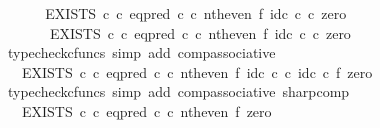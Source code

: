 \begin{isabellebody}
%
\isadelimproof
%
\endisadelimproof
%
\isatagproof
{}\isamarkupfalse%
\ {\isacharminus}{\kern0pt}\isanewline
\ \ \isamarkupfalse%
\ \ {\isachardoublequoteopen}{\isacharparenleft}{\kern0pt}EXISTS\ {\isasymnat}\isactrlsub c\ {\isasymcirc}\isactrlsub c\ {\isacharparenleft}{\kern0pt}eq{\isacharunderscore}{\kern0pt}pred\ {\isasymnat}\isactrlsub c\ {\isasymcirc}\isactrlsub c\ nth{\isacharunderscore}{\kern0pt}even\ {\isasymtimes}\isactrlsub f\ id\isactrlsub c\ {\isasymnat}\isactrlsub c{\isacharparenright}{\kern0pt}\isactrlsup {\isasymsharp}{\isacharparenright}{\kern0pt}\ {\isasymcirc}\isactrlsub c\ zero\isanewline
\ \ \ \ \ \ {\isacharequal}{\kern0pt}\ EXISTS\ {\isasymnat}\isactrlsub c\ {\isasymcirc}\isactrlsub c\ {\isacharparenleft}{\kern0pt}eq{\isacharunderscore}{\kern0pt}pred\ {\isasymnat}\isactrlsub c\ {\isasymcirc}\isactrlsub c\ nth{\isacharunderscore}{\kern0pt}even\ {\isasymtimes}\isactrlsub f\ id\isactrlsub c\ {\isasymnat}\isactrlsub c{\isacharparenright}{\kern0pt}\isactrlsup {\isasymsharp}\ {\isasymcirc}\isactrlsub c\ zero{\isachardoublequoteclose}\isanewline
\ \ \ \ \isamarkupfalse%
\ {\isacharparenleft}{\kern0pt}typecheck{\isacharunderscore}{\kern0pt}cfuncs{\isacharcomma}{\kern0pt}\ simp\ add{\isacharcolon}{\kern0pt}\ comp{\isacharunderscore}{\kern0pt}associative{}{\isacharparenright}{\kern0pt}\isanewline
\ \ \isamarkupfalse%
\ \isamarkupfalse%
\ {\isachardoublequoteopen}{\isachardot}{\kern0pt}{\isachardot}{\kern0pt}{\isachardot}{\kern0pt}\ {\isacharequal}{\kern0pt}\ EXISTS\ {\isasymnat}\isactrlsub c\ {\isasymcirc}\isactrlsub c\ {\isacharparenleft}{\kern0pt}eq{\isacharunderscore}{\kern0pt}pred\ {\isasymnat}\isactrlsub c\ {\isasymcirc}\isactrlsub c\ {\isacharparenleft}{\kern0pt}nth{\isacharunderscore}{\kern0pt}even\ {\isasymtimes}\isactrlsub f\ id\isactrlsub c\ {\isasymnat}\isactrlsub c{\isacharparenright}{\kern0pt}\ {\isasymcirc}\isactrlsub c\ {\isacharparenleft}{\kern0pt}id\isactrlsub c\ {\isasymnat}\isactrlsub c\ {\isasymtimes}\isactrlsub f\ zero{\isacharparenright}{\kern0pt}{\isacharparenright}{\kern0pt}\isactrlsup {\isasymsharp}{\isachardoublequoteclose}\isanewline
\ \ \ \ \isamarkupfalse%
\ {\isacharparenleft}{\kern0pt}typecheck{\isacharunderscore}{\kern0pt}cfuncs{\isacharcomma}{\kern0pt}\ simp\ add{\isacharcolon}{\kern0pt}\ comp{\isacharunderscore}{\kern0pt}associative{}\ sharp{\isacharunderscore}{\kern0pt}comp{\isacharparenright}{\kern0pt}\isanewline
\ \ \isamarkupfalse%
\ \isamarkupfalse%
\ {\isachardoublequoteopen}{\isachardot}{\kern0pt}{\isachardot}{\kern0pt}{\isachardot}{\kern0pt}\ {\isacharequal}{\kern0pt}\ EXISTS\ {\isasymnat}\isactrlsub c\ {\isasymcirc}\isactrlsub c\ {\isacharparenleft}{\kern0pt}eq{\isacharunderscore}{\kern0pt}pred\ {\isasymnat}\isactrlsub c\ {\isasymcirc}\isactrlsub c\ {\isacharparenleft}{\kern0pt}nth{\isacharunderscore}{\kern0pt}even\ {\isasymtimes}\isactrlsub f\ zero{\isacharparenright}{\kern0pt}{\isacharparenright}{\kern0pt}\isactrlsup {\isasymsharp}{\isachardoublequoteclose}\isanewline

\end{isabellebody}
